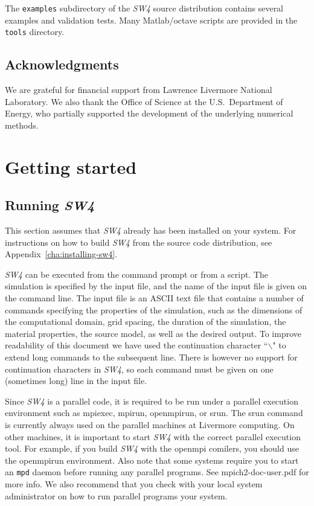 \documentclass[11pt]{report}
\begin{document}
The {\tt examples} subdirectory of the \emph{SW4} source distribution contains several examples and
validation tests. Many Matlab/octave scripts are provided in the {\tt tools} directory.

\section*{Acknowledgments} 
We are grateful for financial support from Lawrence Livermore National Laboratory. We also thank
the Office of Science at the U.S.~Department of Energy, who partially supported the development of
the underlying numerical methods.

\chapter{Getting started}

\section{Running \emph{SW4}}
This section assumes that \emph{SW4} already has been installed on your system. For instructions on
how to build \emph{SW4} from the source code distribution, see Appendix~\ref{cha:installing-sw4}.

\emph{SW4} can be executed from the command prompt or from a script. The simulation is specified by
the input file, and the name of the input file is given on the command line. The input file is an
ASCII text file that contains a number of commands specifying the properties of the simulation, such
as the dimensions of the computational domain, grid spacing, the duration of the simulation, the
material properties, the source model, as well as the desired output. To improve readability of this
document we have used the continuation character ``$\backslash$" to extend long commands to the
subsequent line. There is however no support for continuation characters in \emph{SW4}, so each
command must be given on one (sometimes long) line in the input file.

Since \emph{SW4} is a parallel code, it is required to be run under a parallel execution environment
such as mpiexec, mpirun, openmpirun, or srun. The srun command is currently always used on the
parallel machines at Livermore computing. On other machines, it is important to start \emph{SW4}
with the correct parallel execution tool. For example, if you build \emph{SW4} with the openmpi
comilers, you should use the openmpirun environment. Also note that some systems require you to
start an \verb+mpd+ daemon before running any parallel programs. See mpich2-doc-user.pdf for more
info. We also recommend that you check with your local system administrator on how to run parallel
programs your system.
\end{document}
